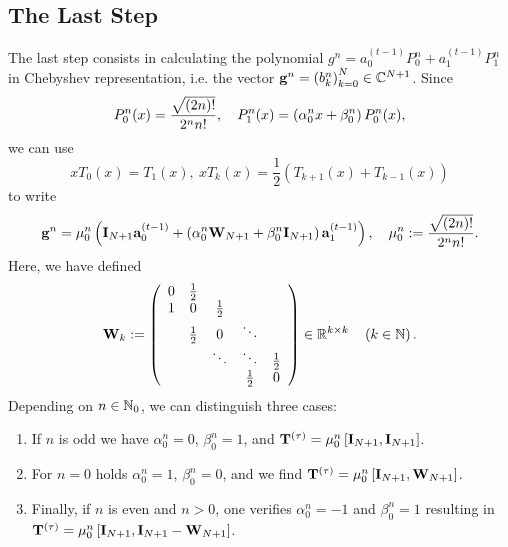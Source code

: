\subsection{The Last Step}
\label{NFSFT:LinearAlgebra:LastStep}
The last step consists in calculating the polynomial $g^{n} = a_{0}^{(t-1)} P_{0}^{n} + a_{1}^{(t-1)} P_{1}^{n}$ in 
Chebyshev representation, i.e. the vector $\mathbf{g}^{n} = \left(b_{k}^n\right)_{k=0}^{N} \in \mathbb{C}^{N+1}$. Since 
\[
  P_{0}^n{\hspace{-0.4ex}}\left(x\right) = \frac{\sqrt{(2n)!}}{2^n n!},\quad P_{1}^n{\hspace{-0.4ex}}\left(x\right) = \left(\alpha_{0}^n x + \beta_{0}^n\right)P_{0}^n(x),
\] 
we can use 
\[
  xT_{0}(x) = T_{1}(x),\ xT_{k}(x) = \frac{1}{2}\left( T_{k+1}(x) + T_{k-1}(x) \right)
\] 
to write
\[ 
  \mathbf{g}^{n} = \mu_{0}^n \left( \mathbf{I}_{N+1} \mathbf{a}_{0}^{(t-1)} + \left( \alpha_{0}^n\mathbf{W}_{N+1} + \beta_{0}^n\mathbf{I}_{N+1} \right) 
  \mathbf{a}_{1}^{(t-1)} \right), \quad \mu_{0}^n := \frac{\sqrt{(2n)!}}{2^n n!}.
\]
Here, we have defined
\[
\mathbf{W}_{k} :=
\left(
\begin{array}{ccccccc}
  0 & \frac{1}{2} &             &                           \\
  1 &           0 & \frac{1}{2} &                           \\
    & \frac{1}{2} &           0 & \ddots                    \\
    &             &      \ddots & \ddots      & \frac{1}{2} \\
    &             &             & \frac{1}{2} &           0
\end{array}
\right)
\in \mathbb{R}^{k \times k} \quad \left(k \in \mathbb{N}\right).
\]
Depending on $n \in \mathbb{N}_{0}$, we can distinguish three cases:
\begin{enumerate}
  \item If $n$ is odd we have  $\alpha_{0}^n = 0$, $\beta_{0}^n = 1$, and $\mathbf{T}^{(\tau)} = 
  \mu_{0}^n \left[ \mathbf{I}_{N+1}, \mathbf{I}_{N+1} \right]$.
  \item  For $n = 0$ holds $\alpha_{0}^n = 1$, $\beta_{0}^n = 0$, and we find $\mathbf{T}^{(\tau)} = 
  \mu_{0}^n \left[ \mathbf{I}_{N+1}, \mathbf{W}_{N+1} \right]$.
  \item Finally, if $n$ is even and $n > 0$, one verifies $\alpha_{0}^n = -1$ and $\beta_{0}^n = 1$ resulting 
  in $\mathbf{T}^{(\tau)} = \mu_{0}^n \left[ \mathbf{I}_{N+1}, \mathbf{I}_{N+1} - \mathbf{W}_{N+1} \right]$.
\end{enumerate}

